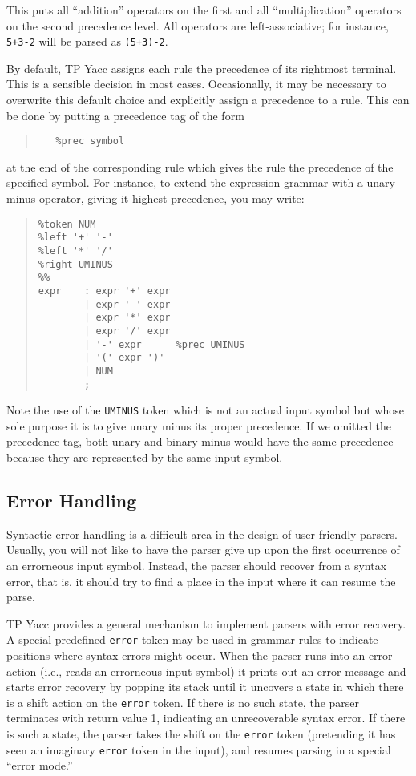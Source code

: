 This puts all ``addition'' operators on the first and all ``multiplication''
operators on the second precedence level. All operators are left-associative;
for instance, \verb"5+3-2" will be parsed as \verb"(5+3)-2".

By default, TP Yacc assigns each rule the precedence of its rightmost
terminal. This is a sensible decision in most cases. Occasionally, it
may be necessary to overwrite this default choice and explicitly assign
a precedence to a rule. This can be done by putting a precedence tag
of the form
\begin{quote}\begin{verbatim}
   %prec symbol
\end{verbatim}\end{quote}
at the end of the corresponding rule which gives the rule the precedence
of the specified symbol. For instance, to extend the expression grammar
with a unary minus operator, giving it highest precedence, you may write:

\begin{quote}\begin{verbatim}
%token NUM
%left '+' '-'
%left '*' '/'
%right UMINUS
%%
expr    : expr '+' expr
        | expr '-' expr
        | expr '*' expr
        | expr '/' expr
        | '-' expr      %prec UMINUS
        | '(' expr ')'
        | NUM
        ;
\end{verbatim}\end{quote}

Note the use of the \verb"UMINUS" token which is not an actual input symbol
but whose sole purpose it is to give unary minus its proper precedence. If
we omitted the precedence tag, both unary and binary minus would have the
same precedence because they are represented by the same input symbol.

\subsection{Error Handling}

Syntactic error handling is a difficult area in the design of user-friendly
parsers. Usually, you will not like to have the parser give up upon the
first occurrence of an errorneous input symbol. Instead, the parser should
recover from a syntax error, that is, it should try to find a place in the
input where it can resume the parse.

TP Yacc provides a general mechanism to implement parsers with error
recovery. A special predefined \verb"error" token may be used in grammar rules
to indicate positions where syntax errors might occur. When the parser runs
into an error action (i.e., reads an errorneous input symbol) it prints out
an error message and starts error recovery by popping its stack until it
uncovers a state in which there is a shift action on the \verb"error" token.
If there is no such state, the parser terminates with return value 1,
indicating an unrecoverable syntax error. If there is such a state, the
parser takes the shift on the \verb"error" token (pretending it has seen
an imaginary \verb"error" token in the input), and resumes parsing in a
special ``error mode.''

